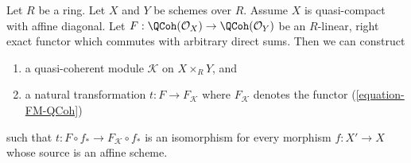 \begin{lemma}
\label{lemma-functor-quasi-coherent-from-affine-diagonal-pre}
Let $R$ be a ring. Let $X$ and $Y$ be schemes over $R$. Assume $X$
is quasi-compact with affine diagonal. Let
$F : \QCoh(\mathcal{O}_X) \to \QCoh(\mathcal{O}_Y)$
be an $R$-linear, right exact functor which commutes
with arbitrary direct sums. Then we can construct
\begin{enumerate}
\item a quasi-coherent module $\mathcal{K}$ on $X \times_R Y$, and
\item a natural transformation $t : F \to F_\mathcal{K}$
where $F_\mathcal{K}$ denotes the functor (\ref{equation-FM-QCoh})
\end{enumerate}
such that $t : F \circ f_* \to F_\mathcal{K} \circ f_*$ is an isomorphism
for every morphism $f : X' \to X$ whose source is an affine scheme.
\end{lemma}

